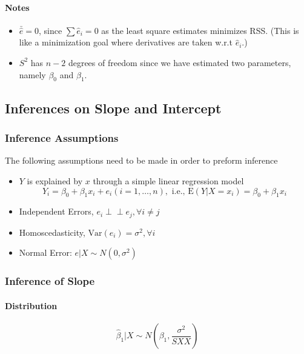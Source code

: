 \documentclass[11pt]{article}
\newcommand{\independent}{\perp \!\!\! \perp}
\begin{document}
\paragraph{Notes}
\begin{itemize}
    \item $\bar{\hat{e}}=0$, since $\sum \hat{e}_i = 0$ as the least square estimates minimizes RSS. (This is like a minimization goal where derivatives are taken w.r.t $\hat{e}_i$.)
    \item $S^2$ has $n-2$ degrees of freedom since we have estimated two parameters, namely $\beta_0$ and $\beta_1$.
\end{itemize}

\subsection{Inferences on Slope and Intercept}
\subsubsection{Inference Assumptions}
The following assumptions need to be made in order to preform inference
\begin{itemize}
    \item $Y$ is explained by $x$ through a simple linear regression model
        \begin{equation*}
            Y_{i}=\beta_{0}+\beta_{1} x_{i}+e_{i}(i=1, \ldots, n), \text { i.e., } \mathrm{E}\left(Y | X=x_{i}\right)=\beta_{0}+\beta_{1} x_{i}
        \end{equation*}
    \item Independent Errors, $e_i \independent e_j, \forall i \neq j$
    \item Homoscedasticity, $\text{Var}(e_i) = \sigma^2, \forall i$
    \item Normal Error: $e | X \sim N\left(0, \sigma^{2}\right)$
\end{itemize}

\subsubsection{Inference of Slope}
\paragraph{Distribution}
\begin{equation*}
    \hat{\beta}_{1} | X \sim N\left(\beta_{1}, \frac{\sigma^{2}}{S X X}\right)
\end{equation*}
\end{document}
